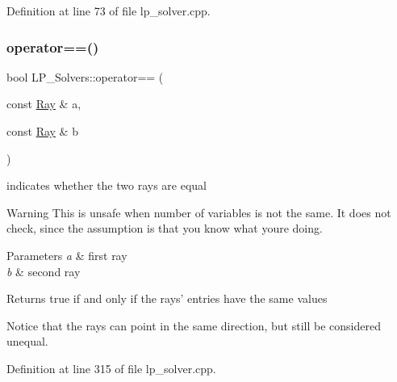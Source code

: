 Definition at line 73 of file lp\+\_\+solver.\+cpp.

\mbox{\label{namespace_l_p___solvers_abda74dc37387f370329de0f20b63f124}} 
\subsubsection{\texorpdfstring{operator==()}{operator==()}\hspace{0.1cm}{\footnotesize\ttfamily [3/3]}}
{\footnotesize\ttfamily bool L\+P\+\_\+\+Solvers\+::operator== (\begin{DoxyParamCaption}\item[{const \hyperlink{group___c_l_s_solvers_class_l_p___solvers_1_1_ray}{Ray} \&}]{a,  }\item[{const \hyperlink{group___c_l_s_solvers_class_l_p___solvers_1_1_ray}{Ray} \&}]{b }\end{DoxyParamCaption})}



indicates whether the two rays are equal 

\begin{DoxyWarning}{Warning}
This is unsafe when number of variables is not the same. It does not check, since the assumption is that you know what you\textquotesingle{}re doing. 
\end{DoxyWarning}

\begin{DoxyParams}{Parameters}
{\em a} & first ray \\
\hline
{\em b} & second ray \\
\hline
\end{DoxyParams}
\begin{DoxyReturn}{Returns}
{\ttfamily true} if and only if the rays' entries have the same values
\end{DoxyReturn}
Notice that the rays can point in the same direction, but still be considered unequal. 

Definition at line 315 of file lp\+\_\+solver.\+cpp.

\mbox{\label{namespace_l_p___solvers_a7e1accee51d4f9339ef83bf93d653544}} 
